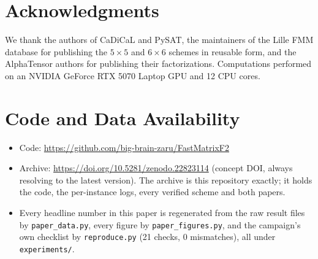 \documentclass[11pt]{article}
\begin{document}
\section*{Acknowledgments}

We thank the authors of CaDiCaL and PySAT, the maintainers of the Lille FMM database for publishing the
$5\times5$ and $6\times6$ schemes in reusable form, and the AlphaTensor authors for publishing their
factorizations. Computations performed on an NVIDIA GeForce RTX 5070 Laptop GPU and 12 CPU cores.

\section*{Code and Data Availability}

\begin{itemize}
\item Code: \url{https://github.com/big-brain-zaru/FastMatrixF2}
\item Archive: \url{https://doi.org/10.5281/zenodo.22823114} (concept DOI, always resolving to the
latest version). The archive is this repository exactly; it holds the code, the per-instance logs, every
verified scheme and both papers.
\item Every headline number in this paper is regenerated from the raw result files by
\texttt{paper\_data.py}, every figure by \texttt{paper\_figures.py}, and the campaign's own
checklist by \texttt{reproduce.py} (21 checks, 0 mismatches), all under \texttt{experiments/}.
\end{itemize}
\end{document}

